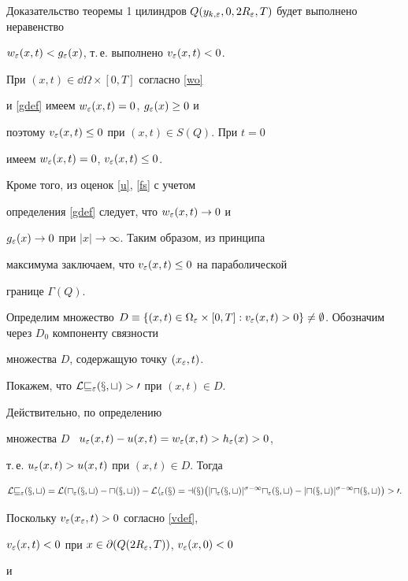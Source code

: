 \begin{pf*}{Доказательство теоремы 1}
цилиндров $Q(y_{k,\varepsilon},0,2R_\varepsilon,T)$ будет выполнено неравенство


$w_\varepsilon(x,t)<g_\varepsilon(x)$, т.\,е. выполнено $v_\varepsilon(x,t)<0$.


При $(x,t)\in\dd\Omega\times [0,T]$ согласно \eqref{wo}


и \eqref{gdef} имеем $w_\varepsilon(x,t)=0$, $g_\varepsilon(x)\geq 0$ и


поэтому $v_\varepsilon(x,t)\leq 0$ при $(x,t)\in S(Q)$. При $t=0$


имеем $w_\varepsilon(x,t)=0$, $v_\varepsilon(x,t)\leq 0$.


Кроме того, из оценок \eqref{u}, \eqref{fs} с учетом


определения \eqref{gdef} следует, что $w_\varepsilon(x,t)\to0$ и


$g_\varepsilon(x)\to0$ при $|x|\to\infty$. Таким образом, из принципа


максимума заключаем, что $v_\varepsilon(x,t)\leq 0$ на параболической


границе $\Gamma(Q)$.





Определим множество $D\equiv\{(x,t) \in \Omega_{\eps}\times [0,T]:


v_\eps(x,t)>0\}\ne\emptyset$. Обозначим через $D_0$ компоненту связности


множества $D$, содержащую точку $(x_\varepsilon,t)$.





Покажем, что $\cal{L}v_\varepsilon(x,t)>0$ при $(x,t)\in D$.


Действительно, по определению


множества $D$ \ $u_\varepsilon(x,t)-u(x,t)=w_\varepsilon(x,t)>h_\varepsilon(x)>0$,


т.\,е. $u_\varepsilon(x,t)>u(x,t)$ при $(x,t)\in D$. Тогда


\begin{equation}


\cal{L}v_\eps(x,t)=\cal{L}(u_\eps(x,t)-u(x,t))-\cal{L}h_\eps(x)=a(x)


\big(|u_\eps(x,t)|^{\sigma-1}u_\eps(x,t)-|u(x,t)|^{\sigma-1}u(x,t)\big)>0.


\label{MaxPrince}


\end{equation}


Поскольку $v_\varepsilon(x_\varepsilon,t)>0$ согласно \eqref{vdef},


$v_\varepsilon(x,t)<0$ при $x\in\partial(Q(2R_{\varepsilon}, T))$, $v_\varepsilon(x,0)<0$


и



\end{pf*}

